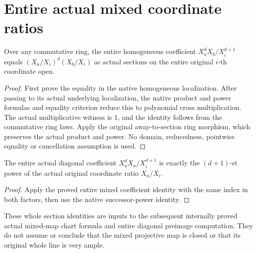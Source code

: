 \section{Entire actual mixed coordinate ratios}
\begin{lemma}
\label{lem:central-embedding-entire-mixed-coefficient-product}
\leanok
Over any commutative ring, the entire homogeneous coefficient
$X_a^dX_b/X_i^{d+1}$ equals $(X_a/X_i)^d(X_b/X_i)$ as actual sections on the
entire original $i$-th coordinate open.
\end{lemma}
\begin{proof}
First prove the equality in the native homogeneous localization. After passing
to its actual underlying localization, the native product and power formulas
and equality criterion reduce this to polynomial cross multiplication.
The actual multiplicative witness is $1$, and the identity follows from the
commutative ring laws. Apply the original away-to-section ring morphism,
which preserves the actual product and power. No domain, reducedness,
pointwise equality or cancellation assumption is used.
\end{proof}
\begin{lemma}
\label{lem:central-embedding-entire-mixed-diagonal-positive-power}
\leanok
The entire actual diagonal coefficient $X_a^dX_a/X_i^{d+1}$ is exactly the
$(d+1)$-st power of the actual original coordinate ratio $X_a/X_i$.
\end{lemma}
\begin{proof}
Apply the proved entire mixed coefficient identity with the same index in
both factors, then use the native successor-power identity.
\end{proof}
These whole section identities are inputs to the subsequent internally proved
actual mixed-map chart formula and entire diagonal preimage computation.
They do not assume or conclude that the mixed projective map is closed or
that its original whole line is very ample.

